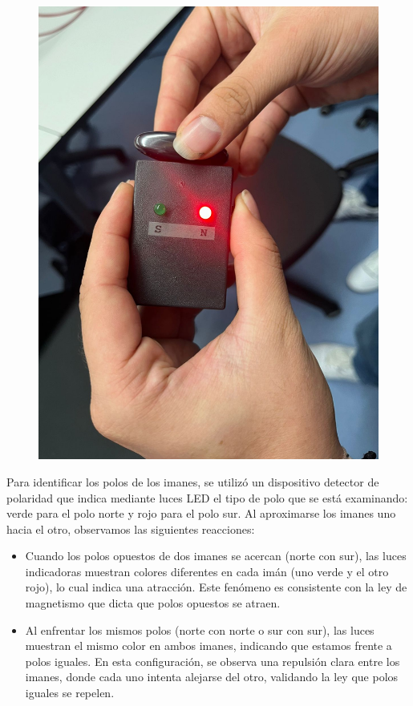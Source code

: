 \begin{figure}[H]
\begin{minipage}{0.3\textwidth}
    \includegraphics[width=\textwidth]{Figures/1. Content/BuscarPolaridad4.jpeg}
    \label{fig: Polaridad Negativa del Iman 3}
  \end{minipage}
  \hfill
\end{figure}

Para identificar los polos de los imanes, se utilizó un dispositivo detector de polaridad que indica mediante luces LED el tipo de polo que se está examinando: verde para el polo norte y rojo para el polo sur. Al aproximarse los imanes uno hacia el otro, observamos las siguientes reacciones:

\begin{itemize}
    \item Cuando los polos opuestos de dos imanes se acercan (norte con sur), las luces indicadoras muestran colores diferentes en cada imán (uno verde y el otro rojo), lo cual indica una atracción. Este fenómeno es consistente con la ley de magnetismo que dicta que polos opuestos se atraen.
    \item Al enfrentar los mismos polos (norte con norte o sur con sur), las luces muestran el mismo color en ambos imanes, indicando que estamos frente a polos iguales. En esta configuración, se observa una repulsión clara entre los imanes, donde cada uno intenta alejarse del otro, validando la ley que polos iguales se repelen.
\end{itemize}

